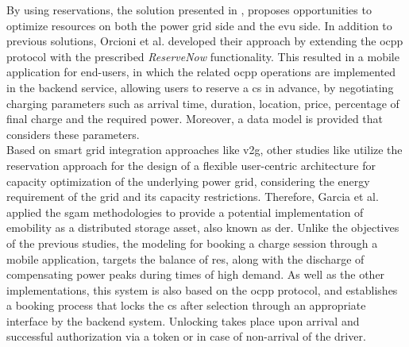 By using reservations, the solution presented in \cite{orcioni_electric_2018}, proposes opportunities to optimize resources on both the power grid side and the \acrshort{evu} side.
In addition to previous solutions, Orcioni et al. developed their approach by extending the \acrshort{ocpp} protocol with the prescribed \textit{ReserveNow} functionality.
This resulted in a mobile application for end-users, in which the related \acrshort{ocpp} operations are implemented in the backend service, allowing users to reserve a \acrshort{cs} in advance, by negotiating charging parameters such as arrival time, duration, location, price, percentage of final charge and the required power.
Moreover, a data model is provided that considers these parameters. \\
\noindent Based on smart grid integration approaches like \acrshort{v2g}, other studies like \cite{garcia_sgam-based_2023} utilize the reservation approach for the design of a flexible user-centric architecture for capacity optimization of the underlying power grid, considering the energy requirement of the grid and its capacity restrictions.
Therefore, Garcia et al. applied the \acrshort{sgam} \cite{noauthor_sgam_nodate} methodologies to provide a potential implementation of \acrshort{emobility} as a distributed storage asset, also known as \acrshort{der}.
Unlike the objectives of the previous studies, the modeling for booking a charge session through a mobile application, targets the balance of \acrshort{res}, along with the discharge of  compensating power peaks during times of high demand. 
As well as the other implementations, this system is also based on the \acrshort{ocpp} protocol, and establishes a booking process that locks the \acrshort{cs} after selection through an appropriate interface by the backend system. Unlocking takes place upon arrival and successful authorization via a token or in case of non-arrival of the driver. \\

